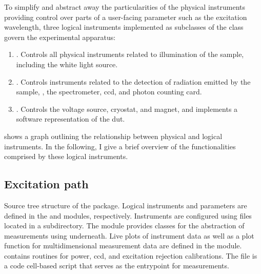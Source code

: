 To simplify and abstract away the particularities of the physical instruments providing control over parts of a user-facing parameter such as the excitation wavelength,
three logical instruments implemented as subclasses of the \qcodes {} class govern the experimental apparatus:
\begin{enumerate}\label{enm:logical_instruments}
    \item \label{itm:logical_instruments:exc}
        .
        Controls all physical instruments related to illumination of the sample, including the white light source.
    \item \label{itm:logical_instruments:det}
        .
        Controls instruments related to the detection of radiation emitted by the sample, \ie, the spectrometer, \gls{ccd}, and photon counting card.
    \item \label{itm:logical_instruments:sam}
        .
        Controls the \qdac voltage source, cryostat, and magnet, and implements a software representation of the \gls{dut}.
\end{enumerate}
 shows a graph outlining the relationship between physical and logical instruments.
In the following, I give a brief overview of the functionalities comprised by these logical instruments.

\subsection{Excitation path}\label{subsec:exp:mjolnir:logical_instruments:exc}
\begin{marginfigure}[*-6]
    
    \caption[]{
        Source tree structure of the \mjolnir package.
        Logical \qcodes instruments and parameters are defined in the  and  modules, respectively.
        Instruments are configured using  files located in a  subdirectory.
        The  module provides classes for the abstraction of measurements using \qcodes underneath.
        Live plots of instrument data as well as a plot function for multidimensional measurement data are defined in the  module.
         contains routines for power, \acrshort{ccd}, and excitation rejection calibrations.
        The  file is a code cell-based script that serves as the entrypoint for measurements.
    }
    \label{fig:exp:mjolnir:tree}
\end{marginfigure}

